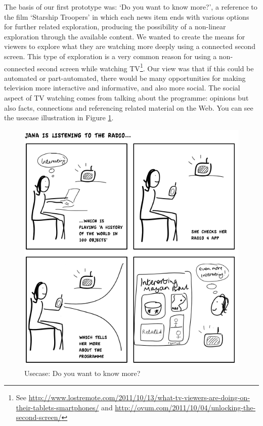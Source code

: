 \documentclass{notube}
\begin{document}
The basis of our first prototype was: `Do you want to know more?', a reference to the film `Starship Troopers' in which each news item ends with various options for further related exploration, producing the possibility of a non-linear exploration through the available content. We wanted to create the means for viewers to explore what they are watching more deeply using a connected second screen. This type of exploration is a very common reason for using a non-connected second screen while watching TV\footnote{See \url{http://www.lostremote.com/2011/10/13/what-tv-viewers-are-doing-on-their-tablets-smartphones/} and  \url{http://ovum.com/2011/10/04/unlocking-the-second-screen/}}. Our view was that if this could be automated or part-automated, there would be many opportunities for making television more interactive and informative, and also more social. The social aspect of TV watching comes from talking about the programme: opinions but also facts, connections and referencing related material on the Web. You can see the usecase illustration in Figure \ref{fig:more}. 

\begin{figure}[htbp]
\begin{center}
\includegraphics[width=6in]{images/more.png}
\caption{Usecase: Do you want to know more?} \label{fig:more}
\end{center}
\end{figure} 
\end{document}
